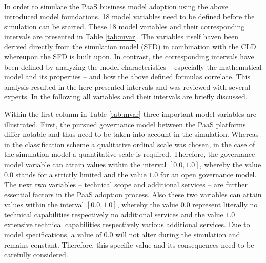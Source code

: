 In order to simulate the \ac{PaaS} business model adoption using the above introduced model foundations, 18 model variables need to be defined before the simulation can be started. These 18 model variables and their corresponding intervals are presented in Table \ref{tab:mvar}. The variables itself haven been derived directly from the simulation model (\ac{SFD}) in combination with the \ac{CLD} whereupon the \ac{SFD} is built upon. In contrast, the corresponding intervals have been defined by analyzing the model characteristics -- especially the mathematical model and its properties -- and how the above defined formulas correlate. This analysis resulted in the here presented intervals and was reviewed with several experts. In the following all variables and their intervals are briefly discussed.

Within the first column in Table \ref{tab:mvar} three important model variables are illustrated. First, the pursued governance model between the \ac{PaaS} platforms differ notable and thus need to be taken into account in the simulation. Whereas in the classification scheme a qualitative ordinal scale was chosen, in the case of the simulation model a quantitative scale is required. Therefore, the governance model variable can attain values within the interval $[0.0,1.0]$, whereby the value $0.0$ stands for a strictly limited and the value $1.0$ for an open governance model. The next two variables -- technical scope and additional services -- are further essential factors in the \ac{PaaS} adoption process. Also these two variables can attain values within the interval $[0.0,1.0]$, whereby the value $0.0$ represent literally no technical capabilities respectively no additional services and the value $1.0$ extensive technical capabilities respectively various additional services. Due to model specifications, a value of $0.0$ will not alter during the simulation and remains constant. Therefore, this specific value and its consequences need to be carefully considered.

\newlength{\originalTabcolsep}
\setlength{\originalTabcolsep}{\tabcolsep}
\setlength{\tabcolsep}{1.5mm}

